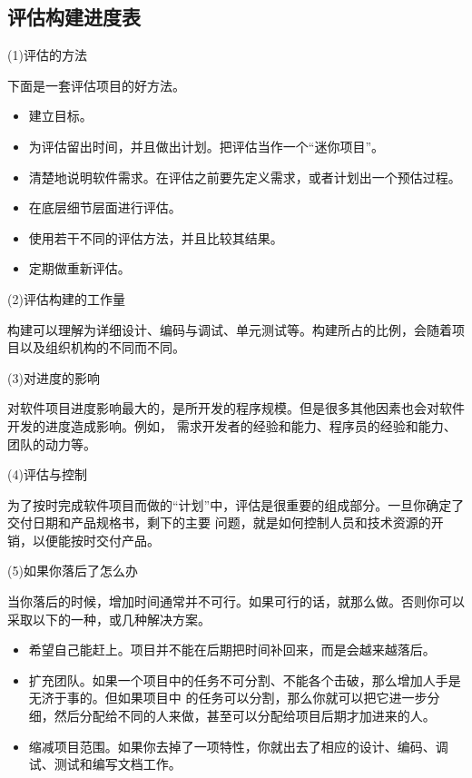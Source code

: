 \documentclass{article}
\begin{document}
\subsection{评估构建进度表}
\par
(1)评估的方法
\par
下面是一套评估项目的好方法。
\begin{itemize}
    \item 建立目标。
    \item 为评估留出时间，并且做出计划。把评估当作一个“迷你项目”。
    \item 清楚地说明软件需求。在评估之前要先定义需求，或者计划出一个预估过程。
    \item 在底层细节层面进行评估。
    \item 使用若干不同的评估方法，并且比较其结果。
    \item 定期做重新评估。
\end{itemize}

\par
(2)评估构建的工作量
\par
构建可以理解为详细设计、编码与调试、单元测试等。构建所占的比例，会随着项目以及组织机构的不同而不同。

\par
(3)对进度的影响
\par
对软件项目进度影响最大的，是所开发的程序规模。但是很多其他因素也会对软件开发的进度造成影响。例如，
需求开发者的经验和能力、程序员的经验和能力、团队的动力等。

\par
(4)评估与控制
\par
为了按时完成软件项目而做的“计划”中，评估是很重要的组成部分。一旦你确定了交付日期和产品规格书，剩下的主要
问题，就是如何控制人员和技术资源的开销，以便能按时交付产品。

\par
(5)如果你落后了怎么办
\par
当你落后的时候，增加时间通常并不可行。如果可行的话，就那么做。否则你可以采取以下的一种，或几种解决方案。
\begin{itemize}
    \item 希望自己能赶上。项目并不能在后期把时间补回来，而是会越来越落后。
    \item 扩充团队。如果一个项目中的任务不可分割、不能各个击破，那么增加人手是无济于事的。但如果项目中
    的任务可以分割，那么你就可以把它进一步分细，然后分配给不同的人来做，甚至可以分配给项目后期才加进来的人。
    \item 缩减项目范围。如果你去掉了一项特性，你就出去了相应的设计、编码、调试、测试和编写文档工作。
\end{itemize}
\end{document}
